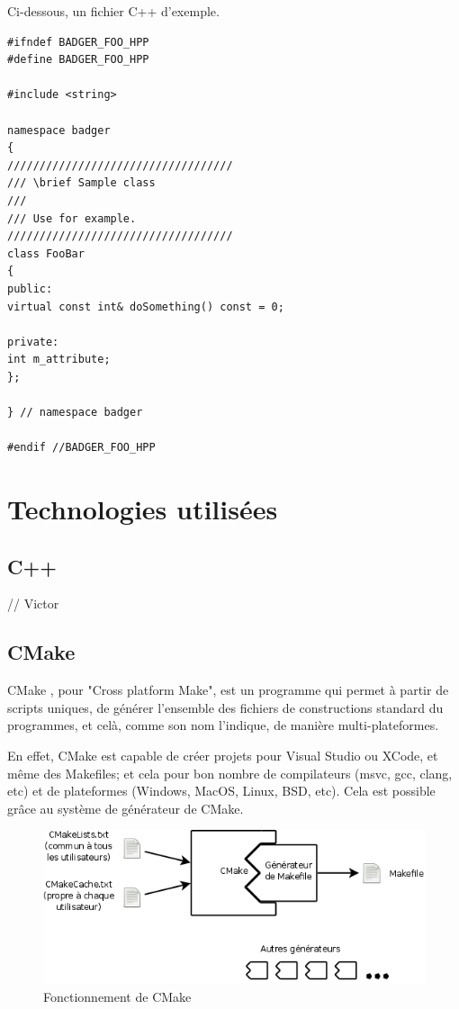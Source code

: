Ci-dessous, un fichier C++ d'exemple.

\begin{lstlisting}
#ifndef BADGER_FOO_HPP
#define BADGER_FOO_HPP

#include <string>

namespace badger
{
///////////////////////////////////
/// \brief Sample class
///
/// Use for example.
///////////////////////////////////
class FooBar
{
public:
virtual const int& doSomething() const = 0;

private:
int m_attribute;
};

} // namespace badger

#endif //BADGER_FOO_HPP
\end{lstlisting}

    \section{Technologies utilisées}

        \subsection{C++}

    // Victor

        \subsection{CMake}

CMake \cite{cmake}, pour "Cross platform Make", est un programme qui permet à partir 
de scripts uniques, de générer l'ensemble des fichiers de constructions standard 
du programmes, et celà, comme son nom l'indique, de manière multi-plateformes.

En effet, CMake est capable de créer projets pour Visual Studio ou XCode, et même 
des Makefiles; et cela pour bon nombre de compilateurs (msvc, gcc, clang, etc) et 
de plateformes (Windows, MacOS, Linux, BSD, etc). Cela est possible grâce au
système de générateur de CMake.

    \begin{figure}[h]
        \begin{center}
        \includegraphics[scale=0.4]{images/CMakeFonctionnement.png} 
        \end{center}
        \caption{Fonctionnement de CMake}
        \label{Fonctionnement de CMake}
     \end{figure} 

